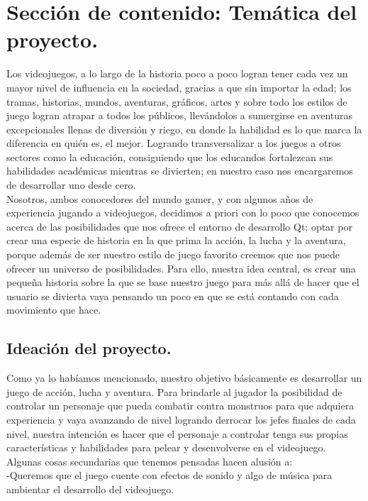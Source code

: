 \documentclass{article}
\begin{document}
\section{Sección de contenido: Temática del proyecto.} \label{contenido}
Los videojuegos, a lo largo de la historia poco a poco logran tener cada vez un mayor nivel de influencia en la sociedad, gracias a que sin importar la edad; los tramas, historias, mundos, aventuras, gráficos, artes y sobre todo los estilos de juego logran atrapar a todos los públicos, llevándolos a sumergirse en aventuras excepcionales llenas de diversión y riego, en donde la habilidad es lo que marca la diferencia en quién es, el mejor. Logrando transversalizar a los juegos a otros sectores como la educación, consiguiendo que los educandos fortalezcan sus habilidades académicas mientras se divierten; en nuestro caso nos encargaremos de desarrollar uno desde cero.\\


Nosotros, ambos conocedores del mundo gamer, y con algunos años de experiencia jugando a videojuegos, decidimos a priori con lo poco que conocemos acerca de las posibilidades que nos ofrece el entorno de desarrollo Qt; optar por crear una especie de historia en la que prima la acción, la lucha y la aventura, porque además de ser nuestro estilo de juego favorito creemos que nos puede ofrecer un universo de posibilidades. Para ello, nuestra idea central, es crear una pequeña historia sobre la que se base nuestro juego para más allá de hacer que el usuario se divierta vaya pensando un poco en que se está contando con cada movimiento que hace.

\subsection{Ideación del proyecto.}

Como ya lo habíamos mencionado, nuestro objetivo básicamente es desarrollar un juego de acción, lucha y aventura. Para brindarle al jugador la posibilidad de controlar un personaje que pueda combatir contra monstruos para que adquiera experiencia y vaya avanzando de nivel logrando derrocar los jefes finales de cada nivel, nuestra intención es hacer que el personaje a controlar tenga sus propias características y habilidades para pelear y desenvolverse en el videojuego. Algunas cosas secundarias que tenemos pensadas hacen alusión a:\\

-Queremos que el juego cuente con efectos de sonido y algo de música para ambientar el desarrollo del videojuego.\\
\end{document}
